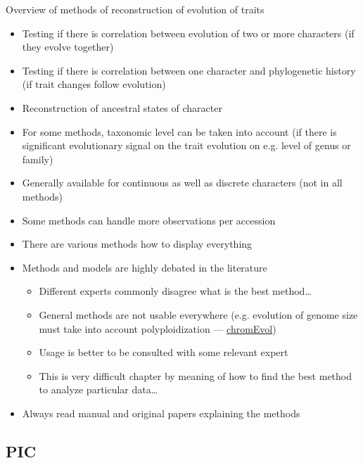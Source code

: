 \documentclass[compress, ucs, xelatex, 11pt, xcolor=svgnames, aspectratio=169,
	hyperref={
		bookmarks=true,
		unicode=true,
		colorlinks=true,
		pdftitle={Molecular data in R},
		plainpages=false,
		pdfauthor={Vojtech Zeisek},
		pdfsubject={Course about phylogeny and evolution in R},
		pdfcreator={XeLaTeX},
		pdfkeywords={R, evolution, phylogeny, molecular data},
		linkcolor=Crimson, %
		anchorcolor=Magenta, %
		citecolor=Magenta, %
		filecolor=Magenta, %
		menucolor=Magenta, %
		urlcolor=DodgerBlue, %
		pdftex},
	url={hyphens, lowtilde} %
	]{beamer}
\begin{document}
\begin{frame}[allowframebreaks]{Overview of methods of reconstruction of evolution of traits}
	\begin{itemize}
		\item Testing if there is correlation between evolution of two or more characters (if they evolve together)
		\item Testing if there is correlation between one character and phylogenetic history (if trait changes follow evolution)
		\item Reconstruction of ancestral states of character
		\item For some methods, taxonomic level can be taken into account (if there is significant evolutionary signal on the trait evolution on e.g. level of genus or family)
		\item Generally available for continuous as well as discrete characters (not in all methods)
		\item Some methods can handle more observations per accession
		\item There are various methods how to display everything
		\item Methods and models are highly debated in the literature
		\begin{itemize}
			\item Different experts commonly disagree what is the best method\ldots
			\item General methods are not usable everywhere (e.g. evolution of genome size must take into account polyploidization --- \href{https://www.tau.ac.il/~itaymay/cp/chromEvol/}{chromEvol})
			\item Usage is better to be consulted with some relevant expert
			\item This is very difficult chapter by meaning of how to find the best method to analyze particular data\ldots
		\end{itemize}
		\item Always read manual and original papers explaining the methods
	\end{itemize}
\end{frame}

\subsection{PIC}
\end{document}
